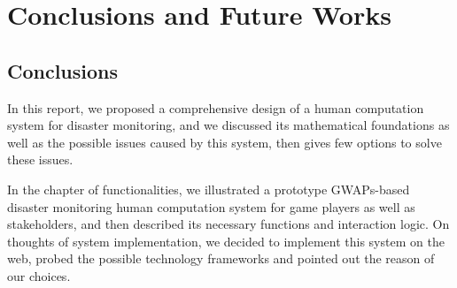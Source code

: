 \section{Conclusions and Future Works}

\subsection{Conclusions}

In this report, we proposed a comprehensive design of a human computation system for disaster monitoring,
and we discussed its mathematical foundations as well as the possible issues caused by this system,
then gives few options to solve these issues. 

In the chapter of functionalities, we illustrated a prototype GWAPs-based disaster monitoring
human computation system for game players as well as stakeholders, and then described its
necessary functions and interaction logic. On thoughts of system implementation, we decided to implement 
this system on the web, probed the possible technology frameworks and pointed out the reason of our choices.

